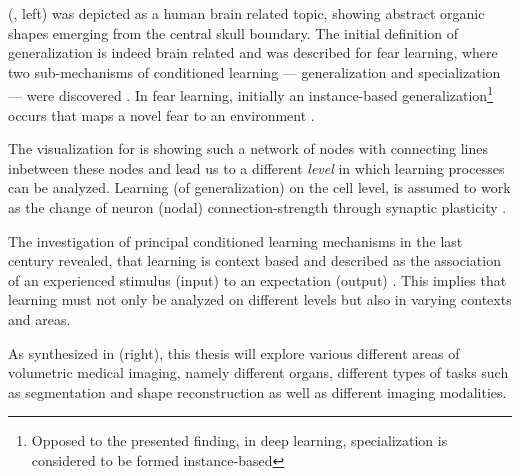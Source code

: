      (, left) was depicted as a human brain related topic, showing abstract organic shapes emerging from the central skull boundary.
    The initial definition of generalization is indeed brain related and was described for fear learning, where two sub-mechanisms of conditioned learning --- generalization and specialization --- were discovered \citep{banich2011generalization}. %
    In fear learning, initially an instance-based generalization\footnote{Opposed to the presented finding, in deep learning, specialization is considered to be formed instance-based} occurs that maps a novel fear to an environment \citep{banich2011generalization}.

    The visualization for  is showing such a network of nodes with connecting lines inbetween these nodes and lead us to a different \emph{level} in which learning processes can be analyzed.
    Learning (of generalization) on the cell level, is assumed to work as the change of neuron (nodal) connection-strength through synaptic plasticity \citep{do1949organization, martin2000synaptic}.

    The investigation of principal conditioned learning mechanisms in the last century revealed, that learning is context based and described as the association of an experienced stimulus (input) to an expectation (output)
    \citep{pavlov1928conditioned, pavlov2010conditioned, banich2011generalization}. This implies that learning must not only be analyzed on different levels but also in varying contexts and areas.

    As synthesized in  (right),
    this thesis will explore various different areas of volumetric medical imaging, namely different organs, different types of tasks such as segmentation and shape reconstruction as well as different imaging modalities.

